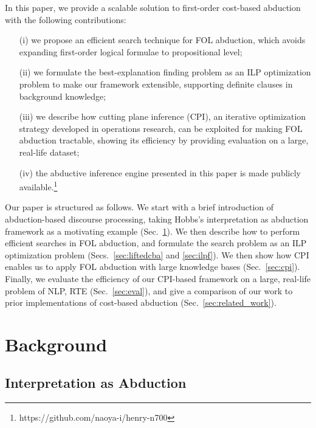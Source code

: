 \documentclass[english]{jnlp_1.4}
\begin{document}
In this paper, we provide a scalable solution to
first-order cost-based abduction with the following contributions:

\begin{itemize}
\item[(i)] we propose an efficient search technique for FOL
  abduction, which avoids expanding first-order logical formulae to
  propositional level;

\item[(ii)] we formulate the best-explanation finding problem as an
  ILP optimization problem to make our framework extensible,
  supporting definite clauses in background knowledge;


\item[(iii)] we describe how cutting plane inference (CPI), an
  iterative optimization strategy developed in operations research,
  can be exploited for making FOL abduction tractable, showing its
  efficiency by providing evaluation on a large, real-life dataset;

\item[(iv)] the abductive inference engine presented in this paper is
  made publicly available.\footnote{https://github.com/naoya-i/henry-n700}
\end{itemize}

Our paper is structured as follows. We start with a brief
introduction of abduction-based discourse processing, taking Hobbs's
interpretation as abduction framework \cite{Hobbs93} as a motivating example
(Sec.~\ref{sec:bg}). We then describe how to perform efficient searches in FOL
abduction, and formulate the search problem as an ILP optimization problem
(Secs.~\ref{sec:liftedcba} and \ref{sec:ilpf}).
We then show how CPI enables us to apply FOL
abduction with large knowledge bases (Sec.~\ref{sec:cpi}). Finally, we
evaluate the efficiency of our CPI-based framework on a large,
real-life problem of NLP, RTE
(Sec.~\ref{sec:eval}), and give a comparison of our work to
prior implementations of cost-based abduction
(Sec.~\ref{sec:related_work}).




\section{Background}
\label{sec:bg}

\subsection{Interpretation as Abduction}
\label{sec:ia}
\end{document}
